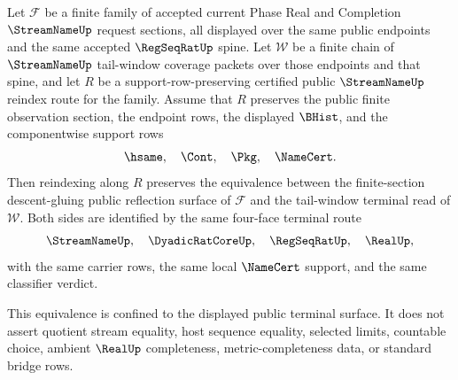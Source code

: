 \begin{theorem}
\label{thm:streamname-reindex-tail-window-terminal-equivalence}
Let $\mathcal{F}$ be a finite family of accepted current Phase Real and
Completion $\StreamNameUp$ request sections, all displayed over the same
public endpoints and the same accepted $\RegSeqRatUp$ spine. Let
$\mathcal{W}$ be a finite chain of $\StreamNameUp$ tail-window coverage
packets over those endpoints and that spine, and let $R$ be a
support-row-preserving certified public $\StreamNameUp$ reindex route for
the family. Assume that $R$ preserves the public finite observation section,
the endpoint rows, the displayed $\BHist$, and the componentwise support rows
$$
\hsame,\quad \Cont,\quad \Pkg,\quad \NameCert.
$$
Then reindexing along $R$ preserves the equivalence between the
finite-section descent-gluing public reflection surface of $\mathcal{F}$ and
the tail-window terminal read of $\mathcal{W}$. Both sides are identified by
the same four-face terminal route
$$
\StreamNameUp,\quad \DyadicRatCoreUp,\quad \RegSeqRatUp,\quad \RealUp,
$$
with the same carrier rows, the same local $\NameCert$ support, and the same
classifier verdict.

This equivalence is confined to the displayed public terminal surface. It
does not assert quotient stream equality, host sequence equality, selected
limits, countable choice, ambient $\RealUp$ completeness,
metric-completeness data, or standard bridge rows.
\end{theorem}
